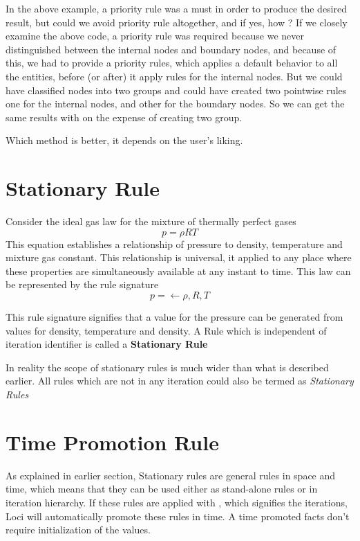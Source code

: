 In the above example, a priority rule was a must in order to produce the
desired result, but could we avoid priority rule altogether, and if yes,
how ? If we closely examine the above code, a priority rule was required
because we never distinguished between the internal nodes and boundary nodes,
and because of this, we had to provide a priority rules, which applies 
a default behavior to all the entities, before (or after) it apply rules
for the internal nodes. But we could have classified nodes into two 
groups and could have created two pointwise rules one for the internal
nodes, and other for the boundary nodes. So we can get the same results
with on the expense of creating two group. 
\par Which method is better, it depends on the user's liking.

\section{ Stationary Rule}
Consider the ideal gas law for the mixture of thermally perfect gases
\begin{equation}
p = \rho R T
\end{equation}
This equation establishes a relationship of pressure to density, temperature
and mixture gas constant. This relationship is universal, it applied to
any place where these properties are simultaneously available at any 
instant to time. This law can be represented by the rule signature
\begin{equation}
p = \leftarrow \rho,  R , T
\end{equation}
\par This rule signature signifies that a value for the pressure can be
generated from values for density, temperature and density.  A Rule which is 
independent of iteration identifier is called a {\bf Stationary Rule}
\par In reality the scope of stationary rules is much wider than what is
described earlier.  All rules which are not in any iteration could also be
termed as {\em Stationary Rules }
%
\section{ Time Promotion Rule}
As explained in earlier section, Stationary rules are general rules in
space and time, which means that they can be used either as stand-alone
rules or in iteration hierarchy. If these rules are applied with {}, which
signifies the iterations, Loci will automatically promote these rules
in time. A time promoted facts don't require initialization of the values.
%
